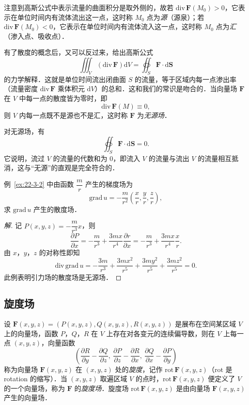 注意到高斯公式中表示流量的曲面积分是取外侧的，故若 $\mathrm{div}\,\bm{F}(M_{0})>0$，它表示在单位时间内有流体流出这一点，这时称 $M_{0}$ 点为\emph{源}（源泉）；若 $\mathrm{div}\,\bm{F}(M_{0})<0$，它表示在单位时间内有流体流入这一点，这时称 $M_{0}$ 点为\emph{汇}（渗入点、吸收点）．

有了散度的概念后，又可以反过来，给出高斯公式
\[
\iiint_{V}(\mathrm{div}\,\bm{F})\mathrm{d}V=\oiint_{S}\bm{F}\cdot\mathrm{d}\bm{S}
\]
的力学解释．这就是单位时间流出闭曲面 $S$ 的流量，等于区域内每一点渗出率（流量密度 $\mathrm{div}\,\bm{F}$ 乘体积元 $\mathrm{d}V$）的总和．这和我们的常识是吻合的．当向量场 $\bm{F}$ 在 $V$ 中每一点的散度皆为零时，即
\[
\mathrm{div}\,\bm{F}(M)\equiv 0,
\]
则 $V$ 内每一点既不是源也不是汇，这时称 $\bm{F}$ 为\emph{无源场}．

对无源场，有
\[
\oiint_{S}\bm{F}\cdot\mathrm{d}\bm{S}=0.
\]
它说明，流过 $V$ 的流量的代数和为 $0$，即流入 $V$ 的流量与流出 $V$ 的流量相互抵消，这与``无源''的直观是完全符合的．

\begin{example}\label{ex:22-3-3}
例~\ref{ex:22-3-2} 中由函数 $\dfrac{m}{r}$ 产生的梯度场为
\[
\mathrm{grad}\,u=-\frac{m}{r^{2}}\left(\frac{x}{r},\frac{y}{r},\frac{z}{r}\right),
\]
求 $\mathrm{grad}\,u$ 产生的散度场．
\end{example}

\begin{proof}[解]
记 $P(x,y,z)=-\dfrac{m}{r^{3}}x$，则
\[
\frac{\partial P}{\partial x}=-\frac{m}{r^{3}}+\frac{3mx}{r^{4}}\frac{\partial r}{\partial x}=-\frac{m}{r^{3}}+\frac{3mx}{r^{4}}\frac{x}{r}.
\]
由 $x$，$y$，$z$ 的对称性即知
\[
\mathrm{div}\,\mathrm{grad}\,u=-\frac{3m}{r^{3}}+\frac{3mx^{2}}{r^{5}}+\frac{3my^{2}}{r^{5}}+\frac{3mz^{2}}{r^{5}}=0.
\]
此例表明引力场的散度场是无源场．
\end{proof}

\subsection{旋度场}

设 $\bm{F}(x,y,z)=\left(P(x,y,z),Q(x,y,z),R(x,y,z)\right)$ 是展布在空间某区域 $V$ 上的向量场，函数 $P$，$Q$，$R$ 在 $V$ 上存在对各变元的连续偏导数，则在 $V$ 上每一点 $(x,y,z)$，向量函数
\[
\left(\frac{\partial R}{\partial y}-\frac{\partial Q}{\partial z},\ \frac{\partial P}{\partial z}-\frac{\partial R}{\partial x},\ \frac{\partial Q}{\partial x}-\frac{\partial P}{\partial y}\right)
\]
称为向量场 $\bm{F}(x,y,z)$ 在 $(x,y,z)$ 处的\emph{旋度}，记作 $\mathrm{rot}\,\bm{F}(x,y,z)$（$\mathrm{rot}$ 是 rotation 的缩写）．当 $(x,y,z)$ 取遍区域 $V$ 的点时，$\mathrm{rot}\,\bm{F}(x,y,z)$ 便定义了 $V$ 的一个向量场，称为 $\bm{F}$ 的\emph{旋度场}．旋度场 $\mathrm{rot}\,\bm{F}(x,y,z)$ 是由向量场 $\bm{F}(x,y,z)$ 产生的向量场．

